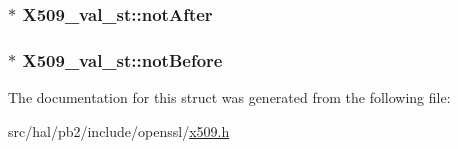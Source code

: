 \subsubsection[{\texorpdfstring{not\+After}{notAfter}}]{$\ast$ X509\+\_\+val\+\_\+st\+::not\+After}\hypertarget{struct_x509__val__st_a9d46618a37d4511c009469509b883838}{}\label{struct_x509__val__st_a9d46618a37d4511c009469509b883838}
\subsubsection[{\texorpdfstring{not\+Before}{notBefore}}]{$\ast$ X509\+\_\+val\+\_\+st\+::not\+Before}\hypertarget{struct_x509__val__st_a49893ccde75b6fb542b3188fe158530d}{}\label{struct_x509__val__st_a49893ccde75b6fb542b3188fe158530d}


The documentation for this struct was generated from the following file\+:\begin{DoxyCompactItemize}
\item 
src/hal/pb2/include/openssl/\hyperlink{x509_8h}{x509.\+h}\end{DoxyCompactItemize}

